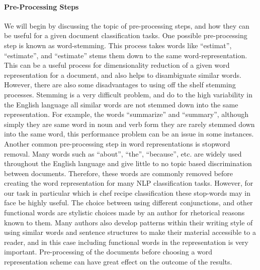 \documentclass[paper=a4, fontsize=11pt]{scrartcl} %
\numberwithin{equation}{section} %
\numberwithin{figure}{section} %
\numberwithin{table}{section} %
\begin{document}
\paragraph{Pre-Processing Steps}
We will begin by discussing the topic of pre-processing steps, and how they can be useful for a given document classification tasks.  
One possible pre-processing step is known as word-stemming.  
This process takes words like ``estimat'', ``estimate'', and ``estimate'' stems them down to the same word-representation.  
This can be a useful process for dimensionality reduction of a given word representation for a document, and also helps to disambiguate similar words.  
However, there are also some disadvantages to using off the shelf stemming processes.  Stemming is a very difficult problem, and do to the high variability in the English language all similar words are not stemmed down into the same representation.  
For example, the words ``summarize'' and ``summary'', although simply they are same word in noun and verb form they are rarely stemmed down into the same word, this performance problem can be an issue in some instances.  
Another common pre-processing step in word representations is stopword removal.  Many words such as ``about'', ``the'', ``because'', etc. are widely used throughout the English language and give little to no topic based discrimination between documents.  
Therefore, these words are commonly removed before creating the word representation for many NLP classification tasks.  However, for our task in particular which is chef recipe classification these stop-words may in face be highly useful.  
The choice between using different conjunctions, and other functional words are stylistic choices made by an author for rhetorical reasons known to them.  
Many authors also develop patterns within their writing style of using similar words and sentence structures to make their material accessible to a reader, and in this case including functional words in the representation is very important.  
Pre-processing of the documents before choosing a word representation scheme can have great effect on the outcome of the results.
\end{document}
